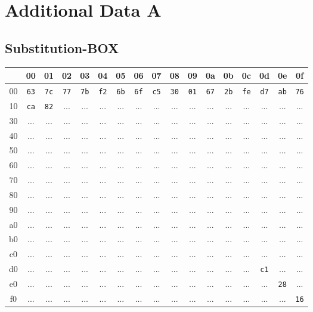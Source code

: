 \chapter{Additional Data A}

\section{Substitution-BOX}
\hypertarget{s-box}{}
\newcommand{\headerrow}{%
	& 00 & 01 & 02 & 03 & 04 & 05 & 06 & 07 & 08 & 09 & 0a & 0b & 0c & 0d & 0e & 0f \\
}

\begin{longtable}{|c||*{16}{c|}}
	\hline
	\headerrow \endhead %
	\hline\hline
	00 & \texttt{63} & \texttt{7c} & \texttt{77} & \texttt{7b} & \texttt{f2} & \texttt{6b} & \texttt{6f} & \texttt{c5} & \texttt{30} & \texttt{01} & \texttt{67} & \texttt{2b} & \texttt{fe} & \texttt{d7} & \texttt{ab} & \texttt{76} \\
	\hline
	10 & \texttt{ca} & \texttt{82} & ... & ... & ... & ... & ... & ... & ... & ... & ... & ... & ... & ... & ... & ... \\
	\hline
	30 & ... & ... & ... & ... & ... & ... & ... & ... & ... & ... & ... & ... & ... & ... & ... & ... \\
	\hline
	40 & ... & ... & ... & ... & ... & ... & ... & ... & ... & ... & ... & ... & ... & ... & ... & ... \\
	\hline
	50 & ... & ... & ... & ... & ... & ... & ... & ... & ... & ... & ... & ... & ... & ... & ... & ... \\
	\hline
	60 & ... & ... & ... & ... & ... & ... & ... & ... & ... & ... & ... & ... & ... & ... & ... & ... \\
	\hline
	70 & ... & ... & ... & ... & ... & ... & ... & ... & ... & ... & ... & ... & ... & ... & ... & ... \\
	\hline
	80 & ... & ... & ... & ... & ... & ... & ... & ... & ... & ... & ... & ... & ... & ... & ... & ... \\
	\hline
	90 & ... & ... & ... & ... & ... & ... & ... & ... & ... & ... & ... & ... & ... & ... & ... & ... \\
	\hline
	a0 & ... & ... & ... & ... & ... & ... & ... & ... & ... & ... & ... & ... & ... & ... & ... & ... \\
	\hline
	b0 & ... & ... & ... & ... & ... & ... & ... & ... & ... & ... & ... & ... & ... & ... & ... & ... \\
	\hline
	c0 & ... & ... & ... & ... & ... & ... & ... & ... & ... & ... & ... & ... & ... & ... & ... & ... \\
	\hline
	d0 & ... & ... & ... & ... & ... & ... & ... & ... & ... & ... & ... & ... & ... & \texttt{c1} & ... & ... \\
	\hline
	e0 & ... & ... & ... & ... & ... & ... & ... & ... & ... & ... & ... & ... & ... & ... & \texttt{28} & ... \\
	\hline
	f0 & ... & ... & ... & ... & ... & ... & ... & ... & ... & ... & ... & ... & ... & ... & ... & \texttt{16} \\
	\hline
\end{longtable}
